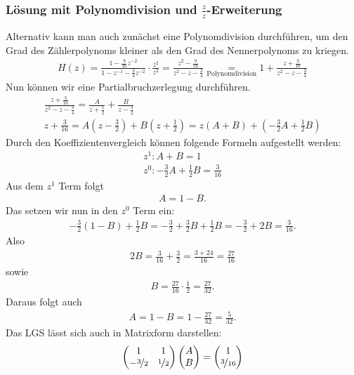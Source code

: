 \documentclass[11pt,a4paper,DIV=12]{scrartcl}
\begin{document}
\subsubsection*{Lösung mit Polynomdivision und $\frac{z}{z}$-Erweiterung}
Alternativ kann man auch zunächst eine Polynomdivision durchführen, um den Grad des Zählerpolynoms kleiner als den Grad des Nennerpolynoms zu kriegen.
\begin{gather}
	H(z)=\frac{1-\frac{9}{16}z^{-2}}{1-z^{-1}-\frac{3}{4}z^{-2}}\cdot\frac{z^2}{z^2}=\frac{z^2-\frac{9}{16}}{z^2-z-\frac{3}{4}}\underset{\text{Polynomdivision}}{=}1+\frac{z+\frac{3}{16}}{z^2-z-\frac{3}{4}}
\end{gather}
Nun können wir eine Partialbruchzerlegung durchführen.
\begin{gather}
	\frac{z+\frac{3}{16}}{z^2-z-\frac{3}{4}}=\frac{A}{z+\frac{1}{2}}+\frac{B}{z-\frac{3}{2}}\\
	z+\frac{3}{16}=A(z-\frac{3}{2})+B(z+\frac{1}{2})=z(A+B)+(-\frac{3}{2}A+\frac{1}{2}B)
\end{gather}
Durch den Koeffizientenvergleich können folgende Formeln aufgestellt werden:
\begin{gather}
	z^1: A+B=1\\
	z^0: -\frac{3}{2}A+\frac{1}{2}B=\frac{3}{16}
\end{gather}
Aus dem $z^1$ Term folgt
\begin{gather}
	A=1-B.
\end{gather}
Das setzen wir nun in den $z^0$ Term ein:
\begin{gather}
	-\frac{3}{2}(1-B)+\frac{1}{2}B=-\frac{3}{2}+\frac{3}{2}B+\frac{1}{2}B=-\frac{3}{2}+2B=\frac{3}{16}.
\end{gather}
Also
\begin{gather}
	2B=\frac{3}{16}+\frac{3}{2}=\frac{3+24}{16}=\frac{27}{16}
\end{gather}
sowie
\begin{gather}
	B=\frac{27}{16}\cdot\frac{1}{2}=\frac{27}{32}.
\end{gather}
Daraus folgt auch
\begin{gather}
	A=1-B=1-\frac{27}{32}=\frac{5}{32}.
\end{gather}
Das LGS lässt sich auch in Matrixform darstellen:
\begin{gather}
	\begin{pmatrix}
		1 & 1\\
		-\nicefrac{3}{2} & \nicefrac{1}{2}
	\end{pmatrix}
	\begin{pmatrix}
		A \\
		B
	\end{pmatrix}
	=
	\begin{pmatrix}
		1 \\
		\nicefrac{3}{16}
	\end{pmatrix}
\end{gather}
\end{document}
